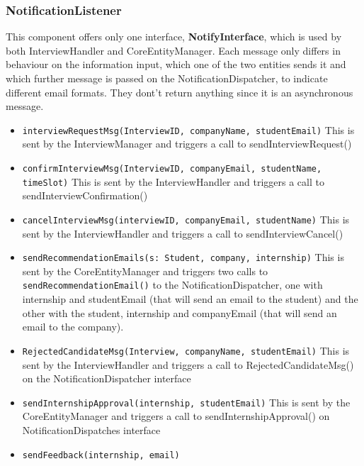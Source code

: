 \subsubsection{NotificationListener} 

This component offers only one interface, \textbf{NotifyInterface}, which is used by both InterviewHandler and CoreEntityManager. Each  message only differs in behaviour on the information input, which one of the two entities sends it and which further message is passed on the NotificationDispatcher, to indicate different email formats. They dont't return anything since it is an asynchronous message.
\begin{itemize}
    \item \texttt{interviewRequestMsg(InterviewID, companyName, studentEmail)}
    This is sent by the InterviewManager and triggers a call to sendInterviewRequest()
    \item \texttt{confirmInterviewMsg(InterviewID, companyEmail, studentName, timeSlot)}
    This is sent by the InterviewHandler and triggers a call to sendInterviewConfirmation()
    \item \texttt{cancelInterviewMsg(interviewID, companyEmail, studentName)}
    This is sent by the InterviewHandler and triggers a call to sendInterviewCancel()
    \item \texttt{sendRecommendationEmails(s: Student, company, internship)} This is sent by the CoreEntityManager and triggers two calls to \texttt{sendRecommendationEmail()} to the NotificationDispatcher, one with internship and studentEmail (that will send an email to the student) and the other with the student, internship and companyEmail (that will send an email to the company).
    \item \texttt{RejectedCandidateMsg(Interview, companyName, studentEmail)}
    This is sent by the InterviewHandler and triggers a call to RejectedCandidateMsg() on the NotificationDispatcher interface
    \item \texttt{sendInternshipApproval(internship, studentEmail)}
    This is sent by the CoreEntityManager and triggers a call to sendInternshipApproval() on NotificationDispatches interface
    \item \texttt{sendFeedback(internship, email)}
\end{itemize}


